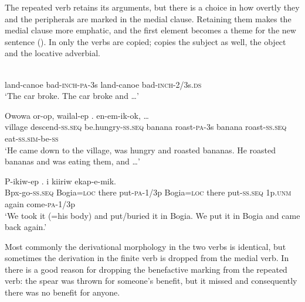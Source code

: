The repeated verb retains its arguments, but there is a choice in how overtly they and the peripherals are marked in the medial clause. Retaining them makes the medial clause more emphatic, and the first element becomes a theme for the new sentence (). In  only the verbs are copied;  copies the subject as well,  the object and  the locative adverbial.

\ea%
\label{ex:8:x1506}
\gll {}      \\
land-canoe  bad-\textsc{inch}-\textsc{pa}-3s land-canoe bad-\textsc{inch}-2/3s.\textsc{ds}\\
\glt`The car broke. The car broke and {\dots}'
\z


\ea%
\label{ex:8:x1507}
\gll Owowa  or-op,  wailal-ep   .    en-em-ik-ok, {\dots} \\
village  descend-\textsc{ss}.\textsc{seq} be.hungry-\textsc{ss}.\textsc{seq} banana  roast-\textsc{pa}-3s banana roast-\textsc{ss}.\textsc{seq}  eat-\textsc{ss}.\textsc{sim}-be-\textsc{ss}\\
\glt`He came down to the village, was hungry and roasted bananas. He roasted bananas and was eating them, and {\dots}'
\z


\ea%
\label{ex:8:x1508}
\gll P-ikiw-ep    .      i  kiiriw  ekap-e-mik. \\
Bpx-go-\textsc{ss}.\textsc{seq} Bogia=\textsc{loc} there put-\textsc{pa}-1/3p Bogia=\textsc{loc} there  put-\textsc{ss}.\textsc{seq} 1p.\textsc{\textsc{unm}} again come-\textsc{\textsc{pa}}-1/3p     \\
\glt`We took it (=his body) and put/buried it in Bogia. We put it in Bogia and came back again.'
\z


Most commonly the derivational morphology in the two verbs is identical, but sometimes the derivation in the finite verb is dropped from the medial verb. In  there is a good reason for dropping the benefactive marking from the repeated verb: the spear was thrown for someone's benefit, but it missed and consequently there was no benefit for anyone.

